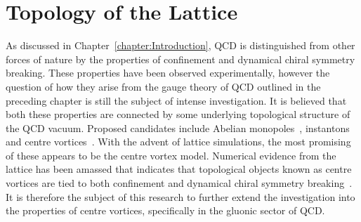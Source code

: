 \chapter{Topology of the Lattice}\label{chapter:Topology}

\ifpdf
    \graphicspath{{Chapter3/Figs/Raster/}{Chapter3/Figs/PDF/}{Chapter3/Figs/}}
\else
    \graphicspath{{Chapter3/Figs/Vector/}{Chapter3/Figs/}}
\fi
As discussed in Chapter~\ref{chapter:Introduction}, QCD is distinguished from other forces of nature by the properties of confinement and dynamical chiral symmetry breaking. These properties have been observed experimentally, however the question of how they arise from the gauge theory of QCD outlined in the preceding chapter is still the subject of intense investigation. It is believed that both these properties are connected by some underlying topological structure of the QCD vacuum. Proposed candidates include Abelian monopoles~\cite{tHooft:1981bkw,Smit:1989vg,Matsubara:1993nq,Suzuki:1989gp,Mandelstam:1974pi,Kronfeld:1987ri,Ivanenko:1990xu, Chernodub:1995tt}, instantons~\cite{Belavin:1975fg,Witten:1978bc,Callan:1977gz,Schafer:1996wv,Trewartha:2013qga,Aharonov:1978jd} and centre vortices~\cite{'tHooft:1977hy,'tHooft:1979uj,Feynman:1981ss,Aharonov:1978jd,Cornwall:1979hz,Nielsen:1979xu,Mack:1978rq}. With the advent of lattice simulations, the most promising of these appears to be the centre vortex model. Numerical evidence from the lattice has been amassed that indicates that topological objects known as centre vortices are tied to both confinement and dynamical chiral symmetry breaking~\cite{Biddle:2018dtc,Faber:1997rp,Langfeld:1998cz,Bowman:2008qd,Trewartha:2015ida,Trewartha:2015nna,Trewartha:2017ive,DelDebbio:1996lih,Greensite:2003bk,DelDebbio:1998luz,OMalley:2011aa,Langfeld:2003ev,Bowman:2010zr}. It is therefore the subject of this research to further extend the investigation into the properties of centre vortices, specifically in the gluonic sector of QCD.\\

